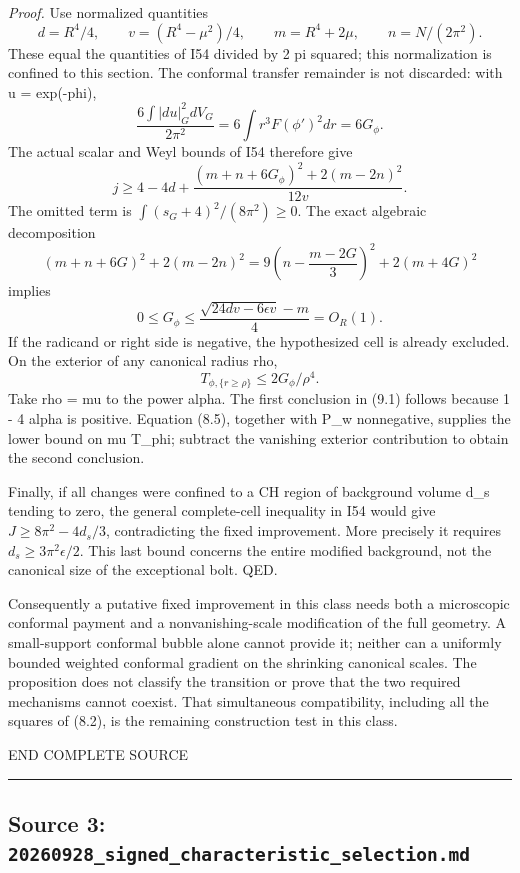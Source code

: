 \documentclass[
  10pt,
]{article}
\begin{document}
\emph{Proof.} Use normalized quantities \[
 d=R^4/4,\qquad v=(R^4-\mu^2)/4,\qquad
 m=R^4+2\mu,\qquad n=N/(2\pi^2).
\] These equal the quantities of I54 divided by 2 pi squared; this
normalization is confined to this section. The conformal transfer
remainder is not discarded: with u = exp(-phi), \[
 \frac{6\int|du|_G^2dV_G}{2\pi^2}
                       =6\int r^3F(\phi')^2dr=6G_\phi.
\] The actual scalar and Weyl bounds of I54 therefore give \[
 j\ge4-4d+
       \frac{(m+n+6G_\phi)^2+2(m-2n)^2}{12v}.
\] The omitted term is \(\int(s_G+4)^2/(8\pi^2)\ge0\). The exact
algebraic decomposition \[
 (m+n+6G)^2+2(m-2n)^2
             =9\left(n-\frac{m-2G}{3}\right)^2+2(m+4G)^2
\] implies \[
 0\le G_\phi\le
             \frac{\sqrt{24dv-6\epsilon v}-m}{4}=O_R(1). \tag{9.2}
\] If the radicand or right side is negative, the hypothesized cell is
already excluded. On the exterior of any canonical radius rho, \[
 T_{\phi,\{r\ge\rho\}}\le2G_\phi/\rho^4.
\] Take rho = mu to the power alpha. The first conclusion in (9.1)
follows because 1 - 4 alpha is positive. Equation (8.5), together with
P\_w nonnegative, supplies the lower bound on mu T\_phi; subtract the
vanishing exterior contribution to obtain the second conclusion.

Finally, if all changes were confined to a CH region of background
volume d\_s tending to zero, the general complete-cell inequality in I54
would give \(J\ge8\pi^2-4d_s/3\), contradicting the fixed improvement.
More precisely it requires \(d_s\ge3\pi^2\epsilon/2\). This last bound
concerns the entire modified background, not the canonical size of the
exceptional bolt. QED.

Consequently a putative fixed improvement in this class needs both a
microscopic conformal payment and a nonvanishing-scale modification of
the full geometry. A small-support conformal bubble alone cannot provide
it; neither can a uniformly bounded weighted conformal gradient on the
shrinking canonical scales. The proposition does not classify the
transition or prove that the two required mechanisms cannot coexist.
That simultaneous compatibility, including all the squares of (8.2), is
the remaining construction test in this class.

END COMPLETE SOURCE

\begin{center}\rule{0.5\linewidth}{0.5pt}\end{center}

\hypertarget{source-3-20260928_signed_characteristic_selection.md}{%
\subsection{Source 3:
\nolinkurl{20260928_signed_characteristic_selection.md}}\label{source-3-20260928_signed_characteristic_selection.md}}
\end{document}
